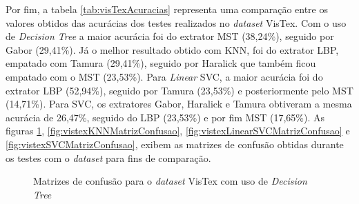 \par Por fim, a tabela \autoref{tab:visTexAcuracias} representa uma comparação entre os valores obtidos das acurácias dos testes realizados no \textit{dataset} VisTex. Com o uso de \textit{Decision Tree} a maior acurácia foi do extrator MST (38,24\%), seguido por Gabor (29,41\%). Já o melhor resultado obtido com KNN, foi do extrator LBP, empatado com Tamura (29,41\%), seguido por Haralick que também ficou empatado com o MST (23,53\%). Para \textit{Linear} SVC, a maior acurácia foi do extrator LBP (52,94\%), seguido por Tamura (23,53\%) e posteriormente pelo MST (14,71\%). Para SVC, os extratores Gabor, Haralick e Tamura obtiveram a mesma acurácia de 26,47\%, seguido do LBP (23,53\%) e por fim MST (17,65\%). As figuras \ref{fig:vistexDecisionTreeMatrizConfusao}, \ref{fig:vistexKNNMatrizConfusao}, \ref{fig:vistexLinearSVCMatrizConfusao} e \ref{fig:vistexSVCMatrizConfusao}, exibem as matrizes de confusão obtidas durante os testes com o \textit{dataset} para fins de comparação.



\begin{figure}[H]
    \centering
    \caption{Matrizes de confusão para o \textit{dataset} VisTex com uso de \textit{Decision Tree}}
    \qquad
    \label{fig:vistexDecisionTreeMatrizConfusao}
\end{figure}

